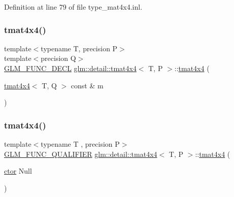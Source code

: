 Definition at line 79 of file type\+\_\+mat4x4.\+inl.

\mbox{\label{structglm_1_1detail_1_1tmat4x4_ad5f2b14d5f60c0b2b27ab28f7df8477b}} 
\subsubsection{\texorpdfstring{tmat4x4()}{tmat4x4()}\hspace{0.1cm}{\footnotesize\ttfamily [3/22]}}
{\footnotesize\ttfamily template$<$typename T, precision P$>$ \\
template$<$precision Q$>$ \\
\hyperlink{setup_8hpp_ab2d052de21a70539923e9bcbf6e83a51}{G\+L\+M\+\_\+\+F\+U\+N\+C\+\_\+\+D\+E\+CL} \hyperlink{structglm_1_1detail_1_1tmat4x4}{glm\+::detail\+::tmat4x4}$<$ T, P $>$\+::\hyperlink{structglm_1_1detail_1_1tmat4x4}{tmat4x4} (\begin{DoxyParamCaption}\item[{\hyperlink{structglm_1_1detail_1_1tmat4x4}{tmat4x4}$<$ T, Q $>$ const \&}]{m }\end{DoxyParamCaption})}

\mbox{\label{structglm_1_1detail_1_1tmat4x4_af4e9ff77d235161a72c835f8609dd8e7}} 
\subsubsection{\texorpdfstring{tmat4x4()}{tmat4x4()}\hspace{0.1cm}{\footnotesize\ttfamily [4/22]}}
{\footnotesize\ttfamily template$<$typename T , precision P$>$ \\
\hyperlink{setup_8hpp_a33fdea6f91c5f834105f7415e2a64407}{G\+L\+M\+\_\+\+F\+U\+N\+C\+\_\+\+Q\+U\+A\+L\+I\+F\+I\+ER} \hyperlink{structglm_1_1detail_1_1tmat4x4}{glm\+::detail\+::tmat4x4}$<$ T, P $>$\+::\hyperlink{structglm_1_1detail_1_1tmat4x4}{tmat4x4} (\begin{DoxyParamCaption}\item[{\hyperlink{structglm_1_1detail_1_1tmat4x4_a314ae2df1758ddf97e2b024c32649cef}{ctor}}]{Null }\end{DoxyParamCaption})\hspace{0.3cm}{\ttfamily [explicit]}}



